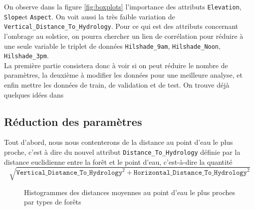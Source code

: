 \documentclass[12pt,a4paper]{article}
\numberwithin{equation}{section}
\newcommand{\elevation}{\texttt{Elevation}}
\newcommand{\aspect}{\texttt{Aspect}}
\newcommand{\slope}{\texttt{Slope}}
\newcommand{\hhydro}{\texttt{Horizontal\_Distance\_To\_Hydrology}}
\newcommand{\vhydro}{\texttt{Vertical\_Distance\_To\_Hydrology}}
\newcommand{\hilshadeM}{\texttt{Hilshade\_9am}}
\newcommand{\hilshadeN}{\texttt{Hilshade\_Noon}}
\newcommand{\hilshadeA}{\texttt{Hilshade\_3pm}}
\begin{document}
	On observe dans la figure \ref{fig:boxplots} l'importance des attributs \elevation, \slope et \aspect. On voit aussi la très faible variation de \vhydro. Pour ce qui est des attributs concernant l'ombrage au solstice, on pourra chercher un lien de corrélation pour réduire à une seule variable le triplet de données \hilshadeM, \hilshadeN, \hilshadeA.\\
	
	La première partie consistera donc à voir si on peut réduire le nombre de paramètres, la deuxième à modifier les données pour une meilleure analyse, et enfin mettre les données de train, de validation et de test. On trouve déjà quelques idées dans \cite{B-D}
	
	\newpage
	
	\subsection{Réduction des paramètres}
	
	Tout d'abord, nous nous contenterons de la distance au point d'eau le plus proche, c'est à dire du nouvel attribut \verb!Distance_To_Hydrology! définie par la distance euclidienne entre la forêt et le point d'eau, c'est-à-dire la quantité $$ \sqrt{ \vhydro^2 +  \hhydro^2}$$
	
	\begin{figure}[h]
		\centering
		\hfill
		\hfill
	\caption{Histogrammes des distances moyennes au point d'eau le plus proches par types de forêts}
	\label{fig:disthist}
	\end{figure}
	
\end{document}
